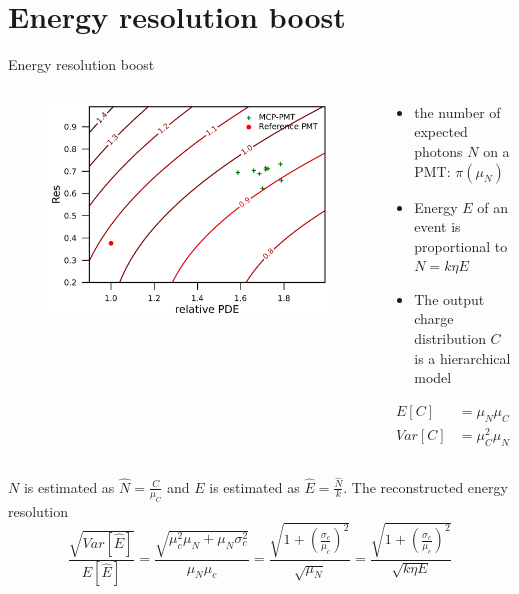 \documentclass[aspectratio=169]{beamer}
\begin{document}
\section{Energy resolution boost}
\begin{frame}{Energy resolution boost}
    \begin{columns}
        \begin{column}{0.4\textwidth}
            \begin{figure}[!htbp]
                \centering
                \includegraphics[width=\textwidth]{../figures/result/resolution.pdf}
            \end{figure}
        \end{column}
        \begin{column}{0.6\textwidth}
            \begin{itemize}
                \item the number of expected photons $N$ on a PMT: $\pi(\mu_N)$
                \item Energy $E$ of an event is proportional to $N=k\eta E$
                \item The output charge distribution $C$ is a hierarchical model
            \end{itemize}
            \begin{align}
                E[C]&=\mu_N\mu_C\\
                Var[C]&=\mu_C^2\mu_N+\mu_N\sigma_C^2
            \end{align}
        \end{column}
    \end{columns}
 $N$ is estimated as $\hat{N}=\frac{C}{\mu_C}$ and $E$ is estimated as $\hat{E}=\frac{\hat{N}}{k}$. The reconstructed energy resolution
    \[
        \frac{\sqrt{Var[\hat{E}]}}{E[\hat{E}]}=\frac{\sqrt{\mu_c^2\mu_N+\mu_N\sigma_c^2}}{\mu_N\mu_c}=\frac{\sqrt{1+(\frac{\sigma_c}{\mu_c})^2}}{\sqrt{\mu_N}}=\frac{\sqrt{1+(\frac{\sigma_c}{\mu_c})^2}}{\sqrt{k\eta E}}
    \]
\end{frame}
\end{document}
